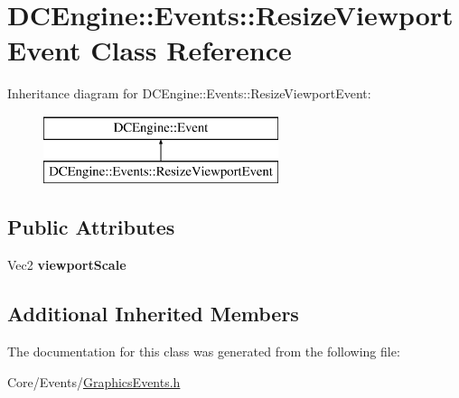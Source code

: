 \hypertarget{classDCEngine_1_1Events_1_1ResizeViewportEvent}{\section{D\-C\-Engine\-:\-:Events\-:\-:Resize\-Viewport\-Event Class Reference}
\label{classDCEngine_1_1Events_1_1ResizeViewportEvent}
}
Inheritance diagram for D\-C\-Engine\-:\-:Events\-:\-:Resize\-Viewport\-Event\-:\begin{figure}[H]
\begin{center}
\leavevmode
\includegraphics[height=2.000000cm]{classDCEngine_1_1Events_1_1ResizeViewportEvent}
\end{center}
\end{figure}
\subsection*{Public Attributes}
\begin{DoxyCompactItemize}
\item 
\hypertarget{classDCEngine_1_1Events_1_1ResizeViewportEvent_a06b8a18e5468826e81458927b74d19a7}{Vec2 {\bfseries viewport\-Scale}}\label{classDCEngine_1_1Events_1_1ResizeViewportEvent_a06b8a18e5468826e81458927b74d19a7}

\end{DoxyCompactItemize}
\subsection*{Additional Inherited Members}


The documentation for this class was generated from the following file\-:\begin{DoxyCompactItemize}
\item 
Core/\-Events/\hyperlink{GraphicsEvents_8h}{Graphics\-Events.\-h}\end{DoxyCompactItemize}
